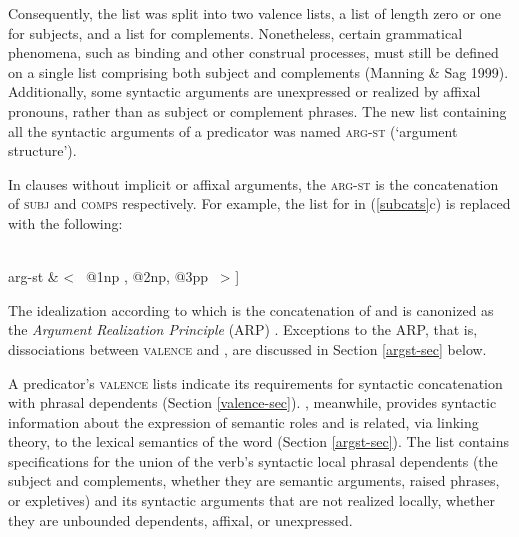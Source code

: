 \documentclass[output=paper]{langsci/langscibook}
\begin{document}
Consequently, the \subcat list was split into two valence lists, a \subj list of length zero or one for subjects, and a \comps list for complements.  Nonetheless, certain grammatical phenomena, such as binding and other construal processes, must still be defined on a single list comprising both subject and complements (Manning \& Sag 1999). Additionally, some syntactic arguments are unexpressed or realized by affixal pronouns, rather than as subject or complement phrases.  
The new list containing all the syntactic arguments of a predicator was named \textsc{arg-st} (`argument structure').  

In clauses without implicit or affixal arguments, the \textsc{arg-st} is the concatenation of  \textsc{subj} and \textsc{comps} respectively.  For example, the \subcat list for  in (\ref{subcats}c) is replaced with the following:

\begin{exe} 
	\label{put}
\ex	%
\begin{avm}
[ phon & < \rm put > \\
valence & [ subj \ \ & <  \ {@1} \ > \\ 
comps \ \ & < \  {@2}, {@3} \  > ] \\ 
arg-st & < \ {@1}np , {@2}np, {@3}pp \  > ] 
\end{avm}
\end{exe}

\noindent
The idealization according to which \argst is the concatenation of \subj and \comps is canonized as the \emph{Argument Realization Principle} (ARP) \citep[PAGE]{SWB2003a}.  Exceptions to the ARP, that is, dissociations between \textsc{valence} and \argst, are discussed in Section \ref{argst-sec} below.  

A predicator's \textsc{valence} lists indicate its requirements for syntactic concatenation with phrasal dependents (Section \ref{valence-sec}). 
\argst, meanwhile, provides syntactic information about the expression of semantic roles and is related, via linking theory, to the lexical semantics of the word (Section \ref{argst-sec}).  
The \argst list contains specifications for the union of the verb's syntactic local phrasal dependents (the subject and complements, whether they are semantic arguments, raised phrases, or expletives) and its syntactic arguments that are not realized locally, whether they are unbounded dependents, affixal, or unexpressed. 
\end{document}
